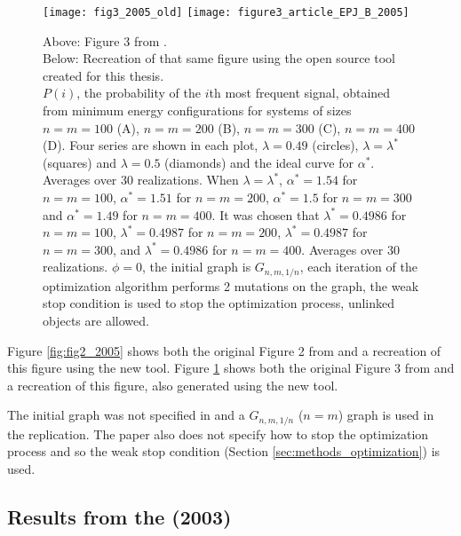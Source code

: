 \begin{figure}
  \centering
  \texttt{[image: fig3\_2005\_old]}
  \texttt{[image: figure3\_article\_EPJ\_B\_2005]}
  \caption{
    Above: Figure 3 from \cite{Ferrer2005a}.\\
    Below: Recreation of that same figure using the open source tool created for this thesis.\\
    $P(i)$, the probability of the $i$th most frequent signal, obtained from minimum energy configurations for systems of sizes $n=m=100$ (A), $n=m=200$ (B), $n=m=300$ (C), $n=m=400$ (D).
    Four series are shown in each plot, $\lambda=0.49$ (circles), $\lambda=\lambda^*$ (squares) and $\lambda=0.5$ (diamonds) and the ideal curve for $\alpha^*$.
    Averages over 30 realizations.
    When $\lambda=\lambda^*$, $\alpha^* = 1.54$ for $n=m=100$, $\alpha^* = 1.51$ for $n=m=200$, $\alpha^* = 1.5$ for $n=m=300$ and $\alpha^* = 1.49$ for $n=m=400$.
    It was chosen that $\lambda^* = 0.4986$ for $n=m=100$, $\lambda^* = 0.4987$ for $n=m=200$, $\lambda^* = 0.4987$ for $n=m=300$, and $\lambda^* = 0.4986$ for $n=m=400$.
    Averages over 30 realizations.
    $\phi=0$, the initial graph is $G_{n,m,1/n}$, each iteration of the optimization algorithm performs 2 mutations on the graph, the weak stop condition is used to stop the optimization process, unlinked objects are allowed.
  }
  \label{fig:fig3_2005}
\end{figure}

Figure \ref{fig:fig2_2005} shows both the original Figure 2 from \cite{Ferrer2005a} and a recreation of this figure using the new tool.
Figure \ref{fig:fig3_2005} shows both the original Figure 3 from \cite{Ferrer2005a} and a recreation of this figure, also generated using the new tool.

The initial graph was not specified in \cite{Ferrer2005a} and a $G_{n,m,1/n}$ ($n=m$) graph is used in the replication.
The paper also does not specify how to stop the optimization process and so the weak stop condition (Section \ref{sec:methods_optimization}) is used.

\subsection{Results from the \secondmodel{} (2003)}
\label{sec:results_verification_second}

